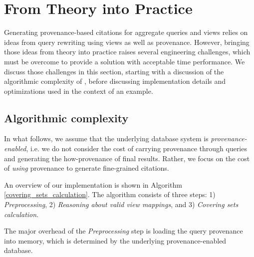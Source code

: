 \section{From Theory into Practice}\label{Sec: implementation}
Generating provenance-based citations for aggregate queries and views relies on ideas from query rewriting using views as well as provenance. However, bringing those ideas from theory into practice raises several engineering challenges, which must be overcome to provide a solution with acceptable time performance.  We discuss those challenges in this section, starting with a discussion of the algorithmic complexity of \provalg, before discussing implementation details and optimizations used in the context of an example.


\subsection{Algorithmic complexity}
In what follows, we assume that the underlying database system is \textit{provenance-enabled}, i.e. we do not consider the cost of carrying provenance through queries and generating the how-provenance of final results.  Rather, we focus on the cost of \textit{using} provenance to generate fine-grained citations.

An overview of our implementation is shown in Algorithm \ref{covering_sets_calculation}.  The algorithm consists of three steps: 1) {\em Preprocessing}, 2) {\em Reasoning about valid view mappings}, and 3) {\em Covering sets calculation}. 

The major overhead of the {\em Preprocessing} step is loading the query provenance into memory, which is determined by the underlying provenance-enabled database. 

